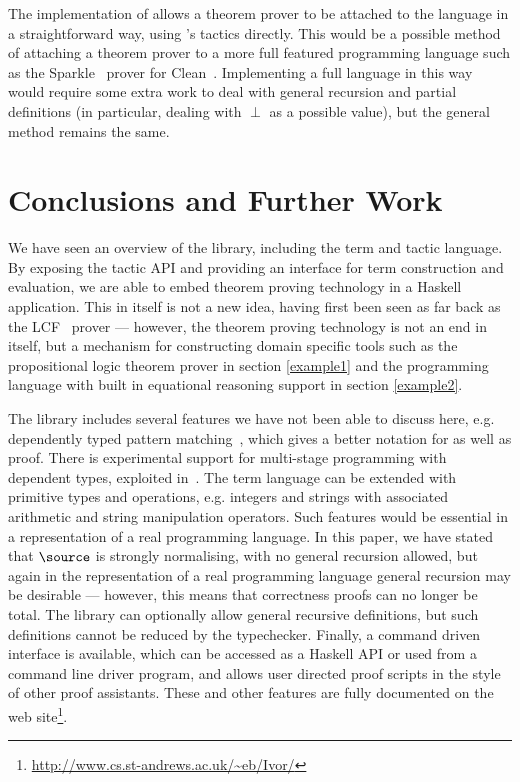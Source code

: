 The implementation of \Funl{} allows a theorem prover to be attached
to the language in a straightforward way, using \Ivor{}'s tactics
directly. This would be a possible method of attaching a theorem
prover to a more full featured programming language such as the
Sparkle~\cite{sparkle} prover for Clean~\cite{clean}. Implementing a
full language in this way would require some extra work to deal
with general recursion and partial definitions (in particular, dealing
with $\perp$ as a possible value), but the general method remains the same.

\section{Conclusions and Further Work}

We have seen an overview of the \Ivor{} library, including the term
and tactic language. By exposing the tactic API and
providing an interface for term construction and evaluation, we are
able to embed theorem proving technology in a Haskell
application. This in itself is not a new idea, having first been seen
as far back as the LCF~\cite{lcf-milner} prover --- however, the
theorem proving technology is not an end in itself, but a
mechanism for constructing domain specific tools such as the
propositional logic theorem prover in section \ref{example1} and the
programming language with built in equational reasoning support in
section \ref{example2}.

The library includes several features we have not been able to discuss
here, e.g. dependently typed pattern matching~\cite{coquand-pm}, which
gives a better notation for  as well as proof.
There is experimental support for multi-stage programming with
dependent types, exploited in~\cite{dtpmsp-gpce}.  The term language
can be extended with primitive types and operations, e.g. integers and
strings with associated arithmetic and string manipulation
operators. Such features would be essential in a representation of a
real programming language. In this paper, we have stated that
$\source$ is strongly normalising, with no general recursion allowed,
but again in the representation of a real programming language general
recursion may be desirable --- however, this means that correctness
proofs can no longer be total. The library can optionally allow
general recursive definitions, but such definitions cannot be reduced
by the typechecker. Finally, a command driven interface is available,
which can be accessed as a Haskell API or used from a command line
driver program, and allows user directed proof scripts in the style of
other proof assistants. These and other features are fully documented
on the web
site\footnote{\url{http://www.cs.st-andrews.ac.uk/~eb/Ivor/}}.

